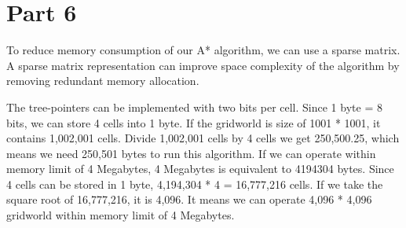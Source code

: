 \documentclass{article}
\begin{document}
\section*{Part 6}
\hspace{5mm}
To reduce memory consumption of our A* algorithm, we can use a sparse matrix. A sparse matrix representation can improve space complexity of the algorithm by removing redundant memory allocation.

The tree-pointers can be implemented with two bits per cell. Since 1 byte = 8 bits, we can store 4 cells into 1 byte. If the gridworld is size of 1001 * 1001, it contains 1,002,001 cells. Divide 1,002,001 cells by 4 cells we get 250,500.25, which means we need 250,501 bytes to run this algorithm. If we can operate within memory limit of 4 Megabytes, 4 Megabytes is equivalent to 4194304 bytes. Since 4 cells can be stored in 1 byte, 4,194,304 * 4 = 16,777,216 cells. If we take the square root of 16,777,216, it is 4,096. It means we can operate 4,096 * 4,096 gridworld within memory limit of 4 Megabytes.
\end{document}
